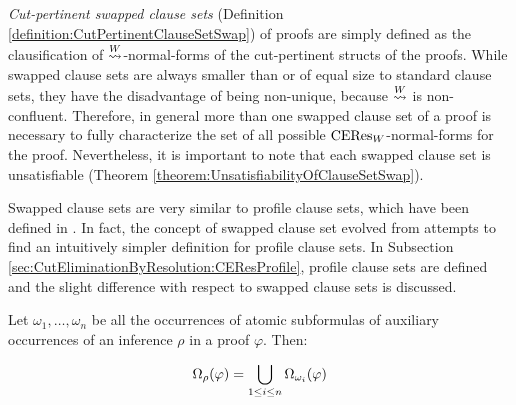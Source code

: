 \documentclass{llncs}
\begin{document}
\emph{Cut-pertinent swapped clause sets} (Definition \ref{definition:CutPertinentClauseSetSwap}) of proofs are simply defined as the clausification of $\stackrel{W}{\leadsto}$-normal-forms of the cut-pertinent structs of the proofs. While swapped clause sets are always smaller than or of equal size to standard clause sets, they have the disadvantage of being non-unique, because $\stackrel{W}{\leadsto}$ is non-confluent. Therefore, in general more than one swapped clause set of a proof is necessary to fully characterize the set of all possible ${\mathrm{CERes}_W}$-normal-forms for the proof. Nevertheless, it is important to note that each swapped clause set is unsatisfiable (Theorem \ref{theorem:UnsatisfiabilityOfClauseSetSwap}).

Swapped clause sets are very similar to profile clause sets, which have been defined in \cite{Hetzl2007CharacteristicClauseSetsandProofTransformations}. In fact, the concept of swapped clause set evolved from attempts to find an intuitively simpler definition for profile clause sets. In Subsection \ref{sec:CutEliminationByResolution:CEResProfile}, profile clause sets are defined and the slight difference with respect to swapped clause sets is discussed.


\begin{definition}
\label{definition:InferenceOccurrences}
Let $\omega_1, \ldots , \omega_n$ be all the occurrences of atomic subformulas of auxiliary occurrences of an inference $\rho$ in a proof $\varphi$. Then:

$$
\Omega_{\rho}(\varphi) = \bigcup_{1 \leq i \leq n} \Omega_{\omega_i}(\varphi)
$$
\end{definition}
\end{document}
